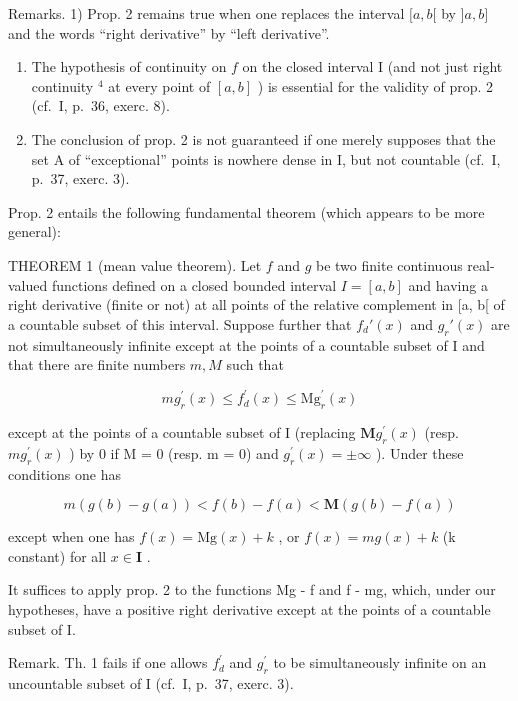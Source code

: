Remarks. 1) Prop. 2 remains true when one replaces the interval \([a, b[\) by \(]a, b]\) and the words ``right derivative'' by ``left derivative''.

\begin{enumerate}
\def\labelenumi{\arabic{enumi})}
\setcounter{enumi}{1}
\item
  The hypothesis of continuity on \(f\) on the closed interval I (and not just right continuity \(^{4}\) at every point of \([a, b]\) ) is essential for the validity of prop. 2 (cf.~I, p.~36, exerc. 8).
\item
  The conclusion of prop. 2 is not guaranteed if one merely supposes that the set A of ``exceptional'' points is nowhere dense in I, but not countable (cf.~I, p.~37, exerc. 3).
\end{enumerate}

Prop. 2 entails the following fundamental theorem (which appears to be more general):

THEOREM 1 (mean value theorem). Let \(f\) and \(g\) be two finite continuous real-valued functions defined on a closed bounded interval \(I = [a, b]\) and having a right derivative (finite or not) at all points of the relative complement in {[}a, b{[} of a countable subset of this interval. Suppose further that \(f_d'(x)\) and \(g_r'(x)\) are not simultaneously infinite except at the points of a countable subset of I and that there are finite numbers \(m, M\) such that

\[
m g _ {r} ^ {\prime} (x) \leqslant f _ {d} ^ {\prime} (x) \leqslant \mathrm{Mg} _ {r} ^ {\prime} (x)\tag{3}
\]

except at the points of a countable subset of I (replacing \(\mathbf{M}g_{r}^{\prime}(x)\) (resp. \(mg_{r}^{\prime}(x)\) ) by 0 if M = 0 (resp. m = 0) and \(g_{r}^{\prime}(x) = \pm\infty\) ). Under these conditions one has

\[
m (g (b) - g (a)) <   f (b) - f (a) <   \mathbf {M} (g (b) - f (a))\tag{4}
\]

except when one has \(f(x) = \mathrm{Mg}(x) + k\) , or \(f(x) = mg(x) + k\) (k constant) for all \(x \in \mathbf{I}\) .

It suffices to apply prop. 2 to the functions Mg - f and f - mg, which, under our hypotheses, have a positive right derivative except at the points of a countable subset of I.

Remark. Th. 1 fails if one allows \(f_{d}^{\prime}\) and \(g_{r}^{\prime}\) to be simultaneously infinite on an uncountable subset of I (cf.~I, p.~37, exerc. 3).

